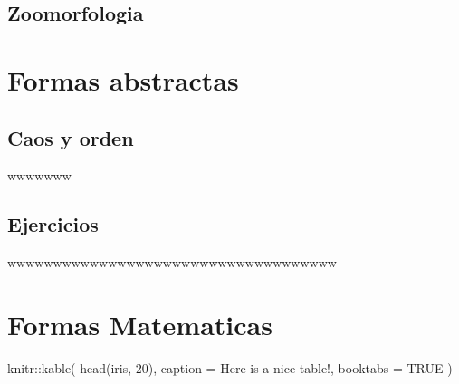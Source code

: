 \documentclass[
  16pt,
]{krantz}
\newenvironment{Shaded}{\begin{snugshade}}{\end{snugshade}}
\newcommand{\AttributeTok}[1]{\textcolor[rgb]{0.77,0.63,0.00}{#1}}
\newcommand{\ConstantTok}[1]{\textcolor[rgb]{0.00,0.00,0.00}{#1}}
\newcommand{\DecValTok}[1]{\textcolor[rgb]{0.00,0.00,0.81}{#1}}
\newcommand{\FunctionTok}[1]{\textcolor[rgb]{0.00,0.00,0.00}{#1}}
\newcommand{\NormalTok}[1]{#1}
\newcommand{\SpecialCharTok}[1]{\textcolor[rgb]{0.00,0.00,0.00}{#1}}
\newcommand{\StringTok}[1]{\textcolor[rgb]{0.31,0.60,0.02}{#1}}
\theoremstyle{definition}
\theoremstyle{definition}
\theoremstyle{definition}
\theoremstyle{definition}
\theoremstyle{remark}
\begin{document}
\hypertarget{zoomorfologia}{%
\section{Zoomorfologia}\label{zoomorfologia}}

\hypertarget{formas-abstractas}{%
\chapter{Formas abstractas}\label{formas-abstractas}}

\hypertarget{caos-y-orden}{%
\section{Caos y orden}\label{caos-y-orden}}

\citep{bookdown2016}wwwwwww \citep{vincze2014college}

\hypertarget{ejercicios}{%
\section{Ejercicios}\label{ejercicios}}

wwwwwwwwwwwwwwwwwwwwwwwwwwwwwwwwwwww

\hypertarget{formas-matematicas}{%
\chapter{Formas Matematicas}\label{formas-matematicas}}

\begin{Shaded}
\begin{Highlighting}[]
\NormalTok{knitr}\SpecialCharTok{::}\FunctionTok{kable}\NormalTok{(}
  \FunctionTok{head}\NormalTok{(iris, }\DecValTok{20}\NormalTok{), }\AttributeTok{caption =} \StringTok{\textquotesingle{}Here is a nice table!\textquotesingle{}}\NormalTok{,}
  \AttributeTok{booktabs =} \ConstantTok{TRUE}
\NormalTok{)}
\end{Highlighting}
\end{Shaded}
\end{document}

